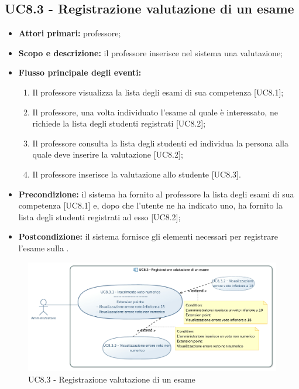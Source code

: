 \documentclass[AnalisiDeiRequisiti.tex]{subfiles}
\begin{document}
\subsection{UC8.3 - Registrazione valutazione di un esame}
\begin{itemize}
	\item \textbf{Attori primari:} professore;
	\item \textbf{Scopo e descrizione:} il professore inserisce nel sistema una valutazione;
	\item \textbf{Flusso principale degli eventi:}
	\begin{enumerate}
		\item Il professore visualizza la lista degli esami di sua competenza [UC8.1];
		\item Il professore, una volta individuato l'esame al quale è interessato, ne richiede la lista degli studenti registrati [UC8.2];
		\item Il professore consulta la lista degli studenti ed individua la persona alla quale deve inserire la valutazione [UC8.2];
		\item Il professore inserisce la valutazione allo studente [UC8.3].
	\end{enumerate}
	\item \textbf{Precondizione:} il sistema ha fornito al professore la lista degli esami di sua competenza [UC8.1] e, dopo che l'utente ne ha indicato uno, ha fornito la lista degli studenti registrati ad esso [UC8.2];
	\item \textbf{Postcondizione:} il sistema fornisce gli elementi necessari per registrare l'esame sulla .
\end{itemize}
\begin{figure}[H]
	\centering
	\includegraphics[width=0.7\linewidth]{UC8_3.jpg}
	\caption{UC8.3 - Registrazione valutazione di un esame}
	\label{UC8.3 - Registrazione valutazione di un esame}
\end{figure}
\end{document}

